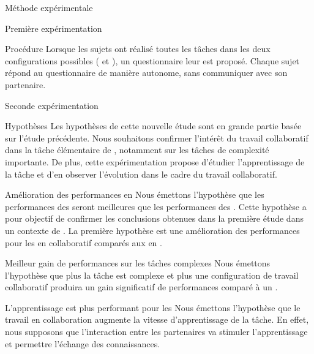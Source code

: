\documentclass[myfrancais]{mythesis}
\begin{document}
\begin{mychapter}{Méthode expérimentale}
\begin{mysection}{Première expérimentation}
\begin{mysubsection}{Procédure}
				Lorsque les sujets ont réalisé toutes les tâches dans les deux configurations possibles ( et ), un questionnaire leur est proposé.
				Chaque sujet répond au questionnaire de manière autonome, sans communiquer avec son partenaire.
			\end{mysubsection}
		\end{mysection}
		\begin{mysection}{Seconde expérimentation}
			\begin{mysubsection}{Hypothèses}
				Les hypothèses de cette nouvelle étude sont en grande partie basée sur l'étude précédente.
				Nous souhaitons confirmer l'intérêt du travail collaboratif dans la tâche élémentaire de , notamment sur les tâches de complexité importante.
				De plus, cette expérimentation propose d'étudier l'apprentissage de la tâche et d'en observer l'évolution dans le cadre du travail collaboratif.
				\begin{myparagraph}{ Amélioration des performances en }
					Nous émettons l'hypothèse que les performances des  seront meilleures que les performances des .
					Cette hypothèse a pour objectif de confirmer les conclusions obtenues dans la première étude dans un contexte de .
					La première hypothèse est une amélioration des performances pour les  en collaboratif comparés aux  en .
				\end{myparagraph}
				\begin{myparagraph}{ Meilleur gain de performances sur les tâches complexes}
					Nous émettons l'hypothèse que plus la tâche est complexe et plus une configuration de travail collaboratif produira un gain significatif de performances comparé à un .
				\end{myparagraph}
				\begin{myparagraph}{ L'apprentissage est plus performant pour les }
					Nous émettons l'hypothèse que le travail en collaboration augmente la vitesse d'apprentissage de la tâche.
					En effet, nous supposons que l'interaction entre les partenaires va stimuler l'apprentissage et permettre l'échange des connaissances.

\end{myparagraph}
\end{mysubsection}
\end{mysection}
\end{mychapter}
\end{document}
